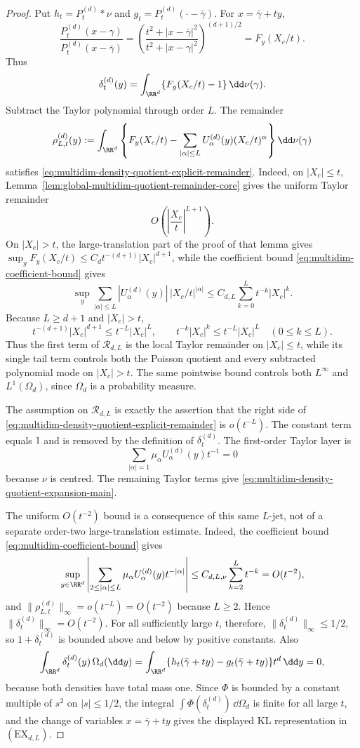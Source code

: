 \begin{proof}
Put \(h_t=P_t^{(d)}*\nu\) and \(g_t=P_t^{(d)}(\cdot-\bar{\gamma})\).
For \(x=\bar{\gamma}+ty\),
\[
\frac{P_t^{(d)}(x-\gamma)}{P_t^{(d)}(x-\bar{\gamma})}
=
\left(\frac{t^2+|x-\bar{\gamma}|^2}{t^2+|x-\gamma|^2}\right)^{(d+1)/2}
=F_y(X_c/t).
\]
Thus
\[
\delta_t^{(d)}(y)=\int_{\RR^d}\{F_y(X_c/t)-1\}\,\dd\nu(\gamma).
\]
Subtract the Taylor polynomial through order \(L\).  The remainder
\[
\rho_{L,t}^{(d)}(y):=
\int_{\RR^d}\left\{
F_y(X_c/t)-\sum_{|\alpha|\le L}U_\alpha^{(d)}(y)(X_c/t)^\alpha
\right\}\dd\nu(\gamma)
\]
satisfies \eqref{eq:multidim-density-quotient-explicit-remainder}.  Indeed,
on \(|X_c|\le t\), Lemma~\ref{lem:global-multidim-quotient-remainder-core}
gives the uniform Taylor remainder
\[
O\!\left(\left|\frac{X_c}{t}\right|^{L+1}\right).
\]
On \(|X_c|>t\), the large-translation part of the proof of that lemma gives
\(\sup_yF_y(X_c/t)\le C_dt^{-(d+1)}|X_c|^{d+1}\), while the coefficient bound
\eqref{eq:multidim-coefficient-bound} gives
\[
\sup_y\sum_{|\alpha|\le L}
|U_\alpha^{(d)}(y)|\,|X_c/t|^{|\alpha|}
\le C_{d,L}\sum_{k=0}^{L}t^{-k}|X_c|^k .
\]
Because \(L\ge d+1\) and \(|X_c|>t\),
\[
t^{-(d+1)}|X_c|^{d+1}\le t^{-L}|X_c|^L,
\qquad
t^{-k}|X_c|^k\le t^{-L}|X_c|^L\quad(0\le k\le L).
\]
Thus the first term of \(\mathcal R_{d,L}\) is the local Taylor remainder on
\(|X_c|\le t\), while its single tail term controls both the Poisson quotient
and every subtracted polynomial mode on \(|X_c|>t\).  The same pointwise
bound controls both \(L^\infty\) and \(L^1(\Omega_d)\), since \(\Omega_d\) is a
probability measure.

The assumption on \(\mathcal R_{d,L}\) is exactly the assertion that the
right side of \eqref{eq:multidim-density-quotient-explicit-remainder} is
\(o(t^{-L})\).
The constant term equals \(1\) and is removed by the definition of
\(\delta_t^{(d)}\).  The first-order Taylor layer is
\[
\sum_{|\alpha|=1}\mu_\alpha U_\alpha^{(d)}(y)t^{-1}=0
\]
because \(\nu\) is centred.  The remaining Taylor terms give
\eqref{eq:multidim-density-quotient-expansion-main}.

The uniform \(O(t^{-2})\) bound is a consequence of this same \(L\)-jet, not
of a separate order-two large-translation estimate.  Indeed, the coefficient
bound \eqref{eq:multidim-coefficient-bound} gives
\[
\sup_{y\in\RR^d}
\left|\sum_{2\le|\alpha|\le L}
\mu_\alpha U_\alpha^{(d)}(y)t^{-|\alpha|}\right|
\le C_{d,L,\nu}\sum_{k=2}^{L}t^{-k}
=O(t^{-2}),
\]
and \(\|\rho_{L,t}^{(d)}\|_\infty=o(t^{-L})=O(t^{-2})\) because \(L\ge2\).
Hence
\(\|\delta_t^{(d)}\|_\infty=O(t^{-2})\).
For all sufficiently large \(t\), therefore, \(\|\delta_t^{(d)}\|_\infty\le
1/2\), so \(1+\delta_t^{(d)}\) is bounded above and below by positive
constants.  Also
\[
\int_{\RR^d}\delta_t^{(d)}(y)\,\Omega_d(\dd y)
=\int_{\RR^d}\{h_t(\bar{\gamma}+ty)-g_t(\bar{\gamma}+ty)\}t^d\,\dd y=0,
\]
because both densities have total mass one.  Since \(\Phi\) is bounded by a
constant multiple of \(s^2\) on \(|s|\le1/2\), the integral
\(\int\Phi(\delta_t^{(d)})\,\dd\Omega_d\) is finite for all large \(t\), and
the change of variables \(x=\bar{\gamma}+ty\) gives the displayed KL
representation in \((\mathrm{EX}_{d,L})\).
\end{proof}

